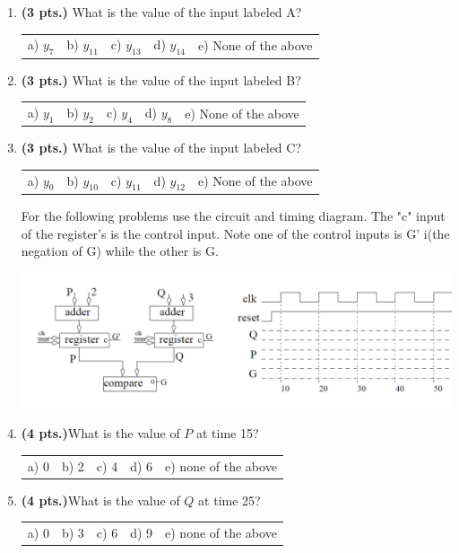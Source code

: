 \documentclass{article}
\begin{document}
\begin{enumerate}
\item {\bf (3 pts.)} What is the value of the input labeled A?

\begin{tabular}{p{0.6in} p{0.6in} p{0.6in} p{0.6in} l}
a) $y_{7}$ & b) $y_{11}$ & c) $y_{13}$ & d) $y_{14}$ & e) None of the above
\end{tabular}

\item {\bf (3 pts.)} What is the value of the input labeled B?

\begin{tabular}{p{0.6in} p{0.6in} p{0.6in} p{0.6in} l}
a) $y_{1}$ & b) $y_{2}$ & c) $y_{4}$ & d) $y_{8}$ & e) None of the above
\end{tabular}

\item {\bf (3 pts.)} What is the value of the input labeled C?

\begin{tabular}{p{0.6in} p{0.6in} p{0.6in} p{0.6in} l}
a) $y_{0}$ & b) $y_{10}$ & c) $y_{11}$ & d) $y_{12}$ & e) None of the above
\end{tabular}

\pagebreak
For the following problems use the circuit  and timing diagram.
The "c" input of the register's is the control input.  Note one
of the control inputs is G' i(the negation of G) while the other 
is G.

\includegraphics[width=15cm]{./Fig2/seqTiming02.png}


\item {\bf (4 pts.)}What is the value of $P$ at time 15?

\begin{tabular}{p{0.6in} p{0.6in} p{0.6in} p{0.6in} l}
a) 0 & b) 2 & c) 4 & d) 6 & e) none of the above
\end{tabular}

\item {\bf (4 pts.)}What is the value of $Q$ at time 25?

\begin{tabular}{p{0.6in} p{0.6in} p{0.6in} p{0.6in} l}
a) 0 & b) 3 & c) 6 & d) 9 & e) none of the above
\end{tabular}


\end{enumerate}
\end{document}
